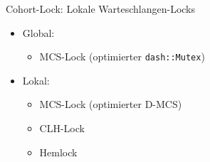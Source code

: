 \documentclass[fleqn,compress,utf8,aspectratio=169,t]{beamer}
\begin{document}
\begin{frame}{Cohort-Lock: Lokale Warteschlangen-Locks}
    \begin{itemize}
        \item Global:
              \begin{itemize}
                  \item MCS-Lock (optimierter \texttt{dash::Mutex})
              \end{itemize}
        \item Lokal:
              \begin{itemize}
                  \item MCS-Lock (optimierter D-MCS)
                  \item CLH-Lock \cite{C-Lock} \cite{LH-Lock}
                  \item Hemlock \cite{Hemlock}
              \end{itemize}
    \end{itemize}
\end{frame}
\end{document}
